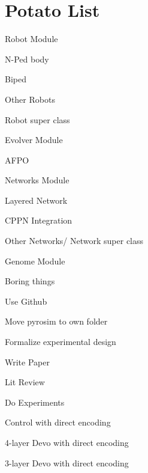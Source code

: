\documentclass[11pt, letterpaper]{article}
\newcommand{\cmark}{\ding{51}}%
\newcommand{\xmark}{\ding{55}}%
\newcommand{\done}{\rlap{$\square$}{\raisebox{2pt}{\large\hspace{1pt}\cmark}}%
\hspace{-2.5pt}}
\newcommand{\wontfix}{\rlap{$\square$}{\large\hspace{1pt}\xmark}}
\begin{document}
\section*{Potato List}
\begin{todolist}
	\item Robot Module
		\begin{todolist}
			\item[\done] N-Ped body
			\item Biped
			\item Other Robots
			\item[\done] Robot super class
		\end{todolist}
	\item[\done] Evolver Module
		\begin{todolist}
			\item[\done] AFPO
		\end{todolist}
	\item Networks Module
		\begin{todolist}
			\item[\done] Layered Network
			\item CPPN Integration
			\item Other Networks/ Network super class
		\end{todolist}
	\item Genome Module
	\item Boring things
		\begin{todolist}
			\item[\done] Use Github
			\item[\wontfix] Move pyrosim to own folder
			\item Formalize experimental design
			\item Write Paper
			\begin{todolist}
				\item Lit Review
				\item Do Experiments
				\begin{todolist}
					\item Control with direct encoding
					\item 4-layer Devo with direct encoding
					\item 3-layer Devo with direct encoding
				\end{todolist}
			\end{todolist}
		\end{todolist}
\end{todolist}
\end{document}
